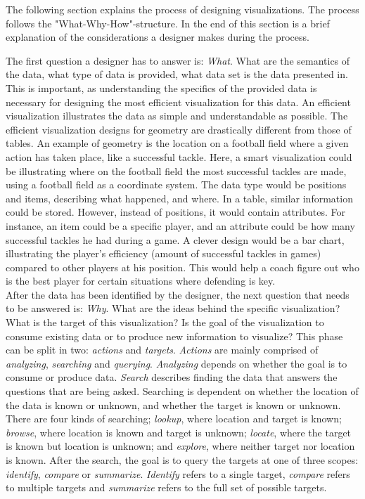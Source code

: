 \documentclass[Report.tex]{subfiles}
\begin{document}
The following section explains the process of designing visualizations. The process follows the "What-Why-How"-structure. In the end of this section is a brief explanation of the considerations a designer makes during the process.

The first question a designer has to answer is: \emph{What}. What are the semantics of the data, what type of data is provided, what data set is the data presented in. This is important, as understanding the specifics of the provided data is necessary for designing the most efficient visualization for this data. An efficient visualization illustrates the data as simple and understandable as possible. The efficient visualization designs for geometry are drastically different from those of tables. An example of geometry is the location on a football field where a given action has taken place, like a successful tackle. Here, a smart visualization could be illustrating where on the football field the most successful tackles are made, using a football field as a coordinate system. The data type would be positions and items, describing what happened, and where. In a table, similar information could be stored. However, instead of positions, it would contain attributes. For instance, an item could be a specific player, and an attribute could be how many successful tackles he had during a game. A clever design would be a bar chart, illustrating the player’s efficiency (amount of successful tackles in games) compared to other players at his position. This would help a coach figure out who is the best player for certain situations where defending is key.\\
After the data has been identified by the designer, the next question that needs to be answered is: \emph{Why}. What are the ideas behind the specific visualization? What is the target of this visualization? Is the goal of the visualization to consume existing data or to produce new information to visualize? This phase can be split in two: \emph{actions} and \emph{targets}. \emph{Actions} are mainly comprised of \emph{analyzing}, \emph{searching} and \emph{querying}. \emph{Analyzing} depends on whether the goal is to consume or produce data. \emph{Search} describes finding the data that answers the questions that are being asked. Searching is dependent on whether the location of the data is known or unknown, and whether the target is known or unknown. There are four kinds of searching; \emph{lookup}, where location and target is known; \emph{browse}, where location is known and target is unknown; \emph{locate}, where the target is known but location is unknown; and \emph{explore}, where neither target nor location is known. After the search, the goal is to query the targets at one of three scopes: \emph{identify}, \emph{compare} or \emph{summarize}. \emph{Identify} refers to a single target, \emph{compare} refers to multiple targets and \emph{summarize} refers to the full set of possible targets.
\end{document}
